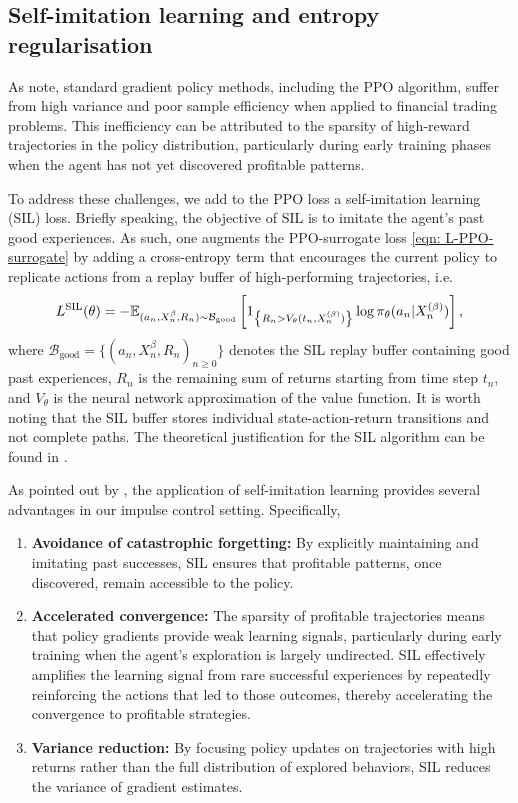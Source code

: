 \subsection{Self-imitation learning and entropy regularisation}
As \textcite{jain2025impulse} note, standard gradient policy methods, including the PPO algorithm, suffer from high variance and poor sample efficiency when applied to financial trading problems. This inefficiency can be attributed to the sparsity of high-reward trajectories in the policy distribution, particularly during early training phases when the agent has not yet discovered profitable patterns. 

To address these challenges, we add to the PPO loss a self-imitation learning (SIL) loss. Briefly speaking, the objective of SIL is to imitate the agent's past good experiences. As such, one augments the PPO-surrogate loss \eqref{eqn: L-PPO-surrogate} by adding a cross-entropy term that encourages the current policy to replicate actions from a replay buffer of high-performing trajectories, i.e.
\begin{align*}
    L^{\text{SIL}}(\theta) = -\mathbb{E}_{(a_n, X^{\beta}_n, R_n) \sim \mathcal{B}_{\text{good}}} \left[ 1_{\left\{R_n > V_\theta(t_n,X^{(\beta)}_n)\right\}} \log \pi_\theta(a_n | X^{(\beta)}_n) \right],
\end{align*}
where $\mathcal{B}_{\text{good}} = \{(a_n, X^{\beta}_n, R_n)_{n \geq 0}\}$ denotes the SIL replay buffer containing good past experiences, $R_n$ is the remaining sum of returns starting from time step $t_n$, and $V_\theta$ is the neural network approximation of the value function. It is worth noting that the SIL buffer stores individual state-action-return transitions and not complete paths. The theoretical justification for the SIL algorithm can be found in \textcite{oh2018self}.

As pointed out by \textcite{jain2025impulse}, the application of self-imitation learning provides several advantages in our impulse control setting. Specifically, 
\begin{enumerate}
    \item \textbf{Avoidance of catastrophic forgetting:} By explicitly maintaining and imitating past successes, SIL ensures that profitable patterns, once discovered, remain accessible to the policy. 
    \item \textbf{Accelerated convergence:} The sparsity of profitable trajectories means that policy gradients provide weak learning signals, particularly during early training when the agent's exploration is largely undirected. SIL effectively amplifies the learning signal from rare successful experiences by repeatedly reinforcing the actions that led to those outcomes, thereby accelerating the convergence to profitable strategies. 
    \item \textbf{Variance reduction:} By focusing policy updates on trajectories with high returns
    rather than the full distribution of explored behaviors, SIL reduces the variance of
    gradient estimates.
\end{enumerate}

